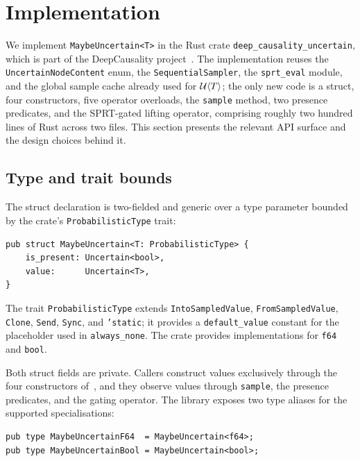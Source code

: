 \section{Implementation}
\label{sec:implementation}

We implement \texttt{MaybeUncertain<T>} in the Rust crate
\texttt{deep\_causality\_uncertain}, which is part of the DeepCausality
project~\cite{hansen_deepcausality}. The implementation reuses the
\texttt{UncertainNodeContent} enum, the \texttt{SequentialSampler},
the \texttt{sprt\_eval} module, and the global sample cache already used
for $\mathcal{U}\langle T \rangle$; the only new code is a struct, four
constructors, five operator overloads, the \texttt{sample} method, two
presence predicates, and the SPRT-gated lifting operator, comprising
roughly two hundred lines of Rust across two files. This section
presents the relevant API surface and the design choices behind it.

\subsection{Type and trait bounds}
\label{sec:impl:type}

The struct declaration is two-fielded and generic over a type parameter
bounded by the crate's \texttt{ProbabilisticType} trait:

\begin{lstlisting}
pub struct MaybeUncertain<T: ProbabilisticType> {
    is_present: Uncertain<bool>,
    value:      Uncertain<T>,
}
\end{lstlisting}

The trait \texttt{ProbabilisticType} extends \texttt{IntoSampledValue},
\texttt{FromSampledValue}, \texttt{Clone}, \texttt{Send}, \texttt{Sync},
and \texttt{'static}; it provides a \texttt{default\_value} constant for
the placeholder used in \texttt{always\_none}. The crate provides
implementations for \texttt{f64} and \texttt{bool}.

Both struct fields are private. Callers construct values exclusively
through the four constructors of~, and they observe
values through \texttt{sample}, the presence predicates, and the gating
operator. The library exposes two type aliases for the supported
specialisations:

\begin{lstlisting}
pub type MaybeUncertainF64  = MaybeUncertain<f64>;
pub type MaybeUncertainBool = MaybeUncertain<bool>;
\end{lstlisting}

